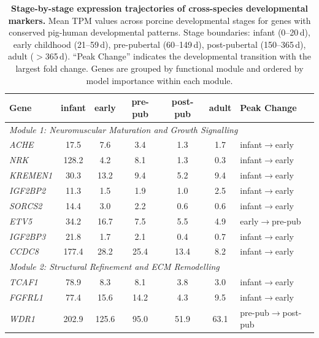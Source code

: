 \documentclass[10pt,a4paper]{article}
\begin{document}
\begin{table}[H]
  \centering
  \caption{\textbf{Stage-by-stage expression trajectories of cross-species developmental markers.} Mean TPM values across porcine developmental stages for genes with conserved pig-human developmental patterns. Stage boundaries: infant (0--20\,d), early childhood (21--59\,d), pre-pubertal (60--149\,d), post-pubertal (150--365\,d), adult ($>$365\,d). ``Peak Change'' indicates the developmental transition with the largest fold change. Genes are grouped by functional module and ordered by model importance within each module.}
  \label{tab:S4}
  \footnotesize
  \begin{tabular}{lcccccl}
    \toprule
    Gene & infant & early & pre-pub & post-pub & adult & Peak Change \\
    \midrule
    \multicolumn{7}{l}{\textit{Module 1: Neuromuscular Maturation and Growth Signalling}} \\
    \textit{ACHE} & 17.5 & 7.6 & 3.4 & 1.3 & 1.7 & infant$\to$early \\
    \textit{NRK} & 128.2 & 4.2 & 8.1 & 1.3 & 0.3 & infant$\to$early \\
    \textit{KREMEN1} & 30.3 & 13.2 & 9.4 & 5.2 & 9.4 & infant$\to$early \\
    \textit{IGF2BP2} & 11.3 & 1.5 & 1.9 & 1.0 & 2.5 & infant$\to$early \\
    \textit{SORCS2} & 14.4 & 3.0 & 2.2 & 0.6 & 0.6 & infant$\to$early \\
    \textit{ETV5} & 34.2 & 16.7 & 7.5 & 5.5 & 4.9 & early$\to$pre-pub \\
    \textit{IGF2BP3} & 21.8 & 1.7 & 2.1 & 0.4 & 0.7 & infant$\to$early \\
    \textit{CCDC8} & 177.4 & 28.2 & 25.4 & 13.4 & 8.2 & infant$\to$early \\
    \midrule
    \multicolumn{7}{l}{\textit{Module 2: Structural Refinement and ECM Remodelling}} \\
    \textit{TCAF1} & 78.9 & 8.3 & 8.1 & 3.8 & 3.0 & infant$\to$early \\
    \textit{FGFRL1} & 77.4 & 15.6 & 14.2 & 4.3 & 9.5 & infant$\to$early \\
    \textit{WDR1} & 202.9 & 125.6 & 95.0 & 51.9 & 63.1 & pre-pub$\to$post-pub \\

\end{tabular}
\end{table}
\end{document}
